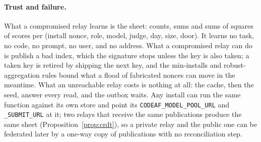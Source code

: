 \documentclass[10pt,a4paper]{article}
\newcommand{\code}[1]{\texttt{#1}}
\theoremstyle{definition}
\theoremstyle{remark}
\begin{document}
\paragraph{Trust and failure.}
What a compromised relay learns is the sheet: counts, sums and sums of squares of scores per (install nonce, role, model, judge, day, size, door). It learns no task, no code, no prompt, no user, and no address. What a compromised relay can do is publish a bad index, which the signature stops unless the key is also taken; a taken key is retired by shipping the next key, and the min-installs and robust-aggregation rules bound what a flood of fabricated nonces can move in the meantime. What an unreachable relay costs is nothing at all: the cache, then the seed, answer every read, and the outbox waits. Any install can run the same function against its own store and point its \code{CODEAF\_MODEL\_POOL\_URL} and \code{\_SUBMIT\_URL} at it; two relays that receive the same publications produce the same sheet (Proposition~\ref{prop:crdt}), so a private relay and the public one can be federated later by a one-way copy of publications with no reconciliation step.
\end{document}
